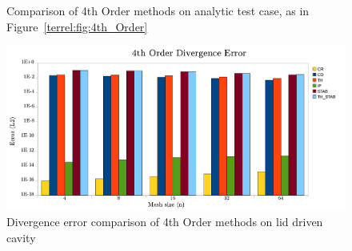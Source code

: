 \begin{figure}
 \caption{Comparison of 4th Order methods on analytic test case, as in Figure~\ref{terrel:fig:4th_Order}}
 \label{terrel:fig:4th_Order_2}
\end{figure}


\begin{figure}
  \includegraphics[scale=.65]{chapters/terrel/pdf/div_4_test.pdf}
  \caption{Divergence error comparison of 4th Order methods on lid driven cavity}
  \label{terrel:fig:4th_Order_lid}
\end{figure}


